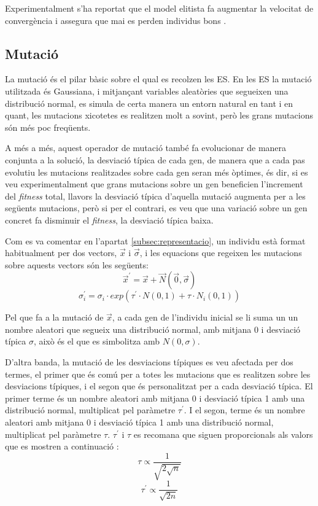 \documentclass[titlepage,a4paper,12pt]{book}
\begin{document}
Experimentalment s'ha reportat que el model elitista fa augmentar la velocitat
de convergència i assegura que mai es perden individus bons \cite{OBS98}.

\subsection{Mutació\label{subsec:ESmut}} La mutació és el pilar bàsic sobre el
qual es recolzen les ES. En les ES la mutació utilitzada és Gaussiana, i
mitjançant variables aleatòries que segueixen una distribució normal, es simula
de certa manera un entorn natural en tant i en quant, les mutacions xicotetes es
realitzen molt a sovint, però les grans mutacions són més poc freqüents.

A més a més, aquest operador de mutació també fa evolucionar de manera conjunta
a la solució, la desviació típica de cada gen, de manera que a cada pas evolutiu
les mutacions realitzades sobre cada gen seran més òptimes, és dir, si es veu
experimentalment que grans mutacions sobre un gen beneficien l'increment del
\emph{fitness} total, llavors la desviació típica d'aquella mutació augmenta per
a les següents mutacions, però si per el contrari, es veu que una variació sobre
un gen concret fa disminuir el \emph{fitness}, la desviació típica baixa.

Com es va comentar en l'apartat \ref{subsec:representacio}, un individu està
format habitualment per dos vectors, $\vec{x}$ i $\vec{\sigma}$, i les equacions
que regeixen les mutacions sobre aquests vectors són les següents: \[
\vec{x}^\prime=\vec{x}+\vec{N}(\vec{0},\vec{\sigma}) \] \[
\sigma_i^\prime=\sigma_i \cdot exp(\tau^\prime \cdot N(0,1) + \tau \cdot
N_i(0,1)) \]

Pel que fa a la mutació de $\vec{x}$, a cada gen de l'individu inicial se li
suma un un nombre aleatori que segueix una distribució normal, amb mitjana 0 i
desviació típica $\sigma$, això és el que es simbolitza amb $N(0,\sigma)$.

D'altra banda, la mutació de les desviacions típiques es veu afectada per dos
termes, el primer que és comú per a totes les mutacions que es realitzen sobre
les desviacions típiques, i el segon que és personalitzat per a cada desviació
típica. El primer terme és un nombre aleatori amb mitjana 0 i desviació típica 1
amb una distribució normal, multiplicat pel paràmetre $\tau^\prime$. I el segon,
terme és un nombre aleatori amb mitjana 0 i desviació típica 1 amb una
distribució normal, multiplicat pel paràmetre $\tau$. $\tau^\prime$ i $\tau$ es
recomana que siguen proporcionals als valors que es mostren a continuació
\cite{Schwefel:1977}: \[ \tau \propto \frac{1}{\sqrt{2 \sqrt{n}}} \] \[
\tau^\prime \propto \frac{1}{\sqrt{2n}} \]
\end{document}
